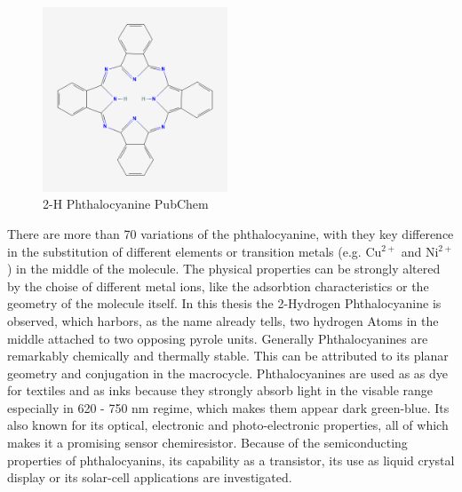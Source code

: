 \begin{figure}
    \centering
    \includegraphics[width=0.49\textwidth]{graphics/Phthalocyanine.png}
    \caption{2-H Phthalocyanine PubChem \cite{phthalacyanine}}
    \label{fig:phtalo}
\end{figure}

There are more than 70 variations of the phthalocyanine, with they key difference in the substitution of different elements or transition metals (e.g. Cu$^{2+}$ and Ni$^{2+}$) in the middle of the molecule.
The physical properties can be strongly altered by the choise of different metal ions, like the adsorbtion characteristics or the geometry of the molecule itself. 
In this thesis the 2-Hydrogen Phthalocyanine is observed, which harbors, as the name already tells, two hydrogen Atoms in the middle attached to two opposing pyrole units.
Generally Phthalocyanines are remarkably chemically and thermally stable.
This can be attributed to its planar geometry and conjugation in the macrocycle.
Phthalocyanines are used as as dye for textiles and as inks because they strongly absorb light in the visable range especially in 620 - 750 nm regime, which makes them appear dark green-blue. 
Its also known for its optical, electronic and photo-electronic properties, all of which makes it a promising sensor chemiresistor.
Because of the semiconducting properties of phthalocyanins, its capability as a transistor, its use as liquid crystal display or its solar-cell applications are investigated. 